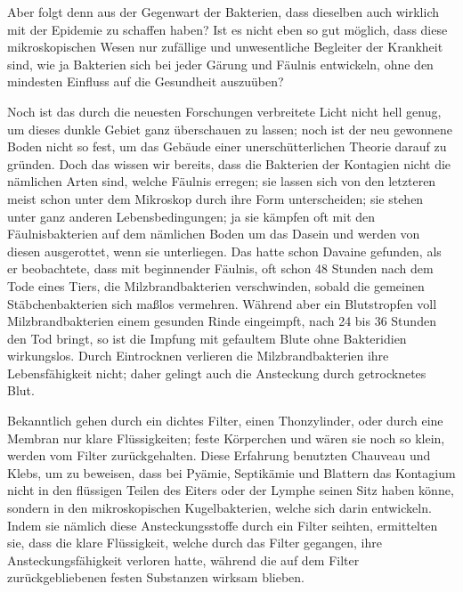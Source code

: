 \documentclass[a4paper, 11pt, oneside, english]{article}
\begin{document}
Aber folgt denn aus der Gegenwart der Bakterien, dass dieselben auch wirklich mit der Epidemie zu schaffen haben? Ist es nicht eben so gut möglich, dass diese mikroskopischen Wesen nur zufällige und unwesentliche Begleiter der Krankheit sind, wie ja Bakterien sich bei jeder Gärung und Fäulnis entwickeln, ohne den mindesten Einfluss auf die Gesundheit auszuüben?

Noch ist das durch die neuesten Forschungen verbreitete Licht nicht hell genug, um dieses dunkle Gebiet ganz überschauen zu lassen; noch ist der neu gewonnene Boden nicht so fest, um das Gebäude einer unerschütterlichen Theorie darauf zu gründen. Doch das wissen wir bereits, dass die Bakterien der Kontagien nicht die nämlichen Arten sind, welche Fäulnis erregen; sie lassen sich von den letzteren meist schon unter dem Mikroskop durch ihre Form unterscheiden; sie stehen unter ganz anderen Lebensbedingungen; ja sie kämpfen oft mit den Fäulnisbakterien auf dem nämlichen Boden um das Dasein und werden von diesen ausgerottet, wenn sie unterliegen. Das hatte schon Davaine gefunden, als er beobachtete, dass mit beginnender Fäulnis, oft schon 48 Stunden nach dem Tode eines Tiers, die Milzbrandbakterien verschwinden, sobald die gemeinen Stäbchenbakterien sich maßlos vermehren. Während aber ein Blutstropfen voll Milzbrandbakterien einem gesunden Rinde eingeimpft, nach 24 bis 36 Stunden den Tod bringt, so ist die Impfung mit gefaultem Blute ohne Bakteridien wirkungslos. Durch Eintrocknen verlieren die Milzbrandbakterien ihre Lebensfähigkeit nicht; daher gelingt auch die Ansteckung durch getrocknetes Blut.

Bekanntlich gehen durch ein dichtes Filter, einen Thonzylinder, oder durch eine Membran nur klare Flüssigkeiten; feste Körperchen und wären sie noch so klein, werden vom Filter zurückgehalten. Diese Erfahrung benutzten Chauveau und Klebs, um zu beweisen, dass bei Pyämie, Septikämie und Blattern das Kontagium nicht in den flüssigen Teilen des Eiters oder der Lymphe seinen Sitz haben könne, sondern in den mikroskopischen Kugelbakterien, welche sich darin entwickeln. Indem sie nämlich diese Ansteckungsstoffe durch ein Filter seihten, ermittelten sie, dass die klare Flüssigkeit, welche durch das Filter gegangen, ihre Ansteckungsfähigkeit verloren hatte, während die auf dem Filter zurückgebliebenen festen Substanzen wirksam blieben.
\end{document}
